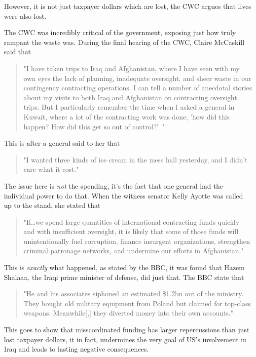 \documentclass{article}
\begin{document}
        However, it is not just taxpayer dollars which are lost, the CWC argues that lives were also lost. 

        The CWC was incredibly critical of the government, exposing just how truly rampant the waste was. During the final hearing of the CWC, Claire McCaskill said that 
        \begin{quote}
            "I have taken trips to Iraq and Afghanistan, where I have seen with my own eyes the lack of planning, inadequate oversight, and sheer waste in our contingency contracting operations. I can tell a number of anecdotal stories about my visits to both Iraq and Afghanistan on contracting oversight trips. But I particularly remember the time when I asked a general in Kuwait, where a lot of the contracting work was done, 'how did this happen? How did this get so out of control?'~\cite{us_senate2011wartime_contracting}"
        \end{quote}
        This is after a general said to her that 
        \begin{quote}
            "I wanted three kinds of ice cream in the mess hall yesterday, and I didn't care what it cost."~\cite{us_senate2011wartime_contracting}
        \end{quote}
        The issue here is \textit{not} the spending, it's the fact that one general had the individual power to do that. 
        When the witness senator Kelly Ayotte was called up to the stand, she stated that \begin{quote}
            "If\ldots we spend large quantities of international contracting funds quickly and with insufficient oversight, it is likely  that some of those funds will unintentionally fuel corruption, finance insurgent organizations, strengthen criminal patronage networks, and undermine our efforts in Afghanistan." \cite{us_senate2011wartime_contracting}
        \end{quote}
        This is \textit{exactly} what happened, as stated by the BBC, it was found that Hazem Shalaan, the Iraqi prime minister of defense, did just that. The BBC state that
        \begin{quote}
            "He and his associates siphoned an estimated \$1.2bn out of the ministry. They bought old military equipment from Poland but claimed for top-class weapons. Meanwhile[,] they diverted money into their own accounts."
        \end{quote}
        This goes to show that misscordinated funding has larger repercussions than just lost taxpayer dollars, it in fact, undermines the very goal of US's involvement in Iraq and leads to lasting negative consequences. 
\end{document}
